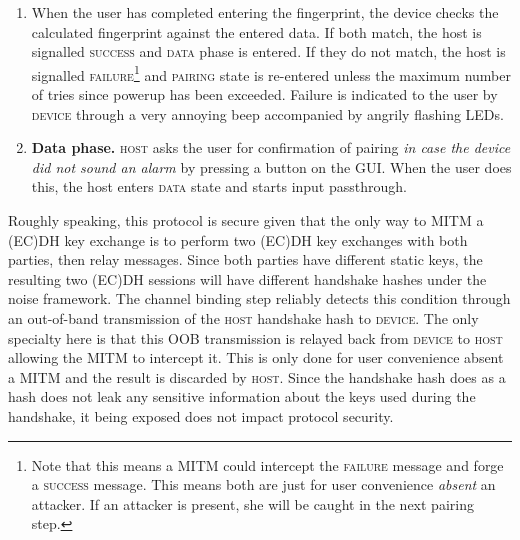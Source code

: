 \documentclass[12pt,a4paper,notitlepage]{article}
\begin{document}
\begin{enumerate}
    field in the pairing GUI. This display is only for user convenience and not relevant to the cryptographic handshake.
    A consequence of this is that a MITM could observe the \emph{fingerprint}\footnote{
        A MITM could also modify the fingerprint information sent from \textsc{device} to \textsc{host}. This would be
        very obvious to the user, since the fingerprint appearing on the \textsc{host} screen would differ from what she
        types.
    }. We show in section \ref{prot_ver} that this does not reduce the protocol's security.
\item When the user has completed entering the fingerprint, the device checks the calculated fingerprint against the
    entered data. If both match, the host is signalled \textsc{success} and \textsc{data} phase is entered. If they do
    not match, the host is signalled \textsc{failure}\footnote{
        Note that this means a MITM could intercept the \textsc{failure} message and forge a \textsc{success} message.
        This means both are just for user convenience \emph{absent} an attacker. If an attacker is present, she will be
        caught in the next pairing step.
    } and \textsc{pairing} state is re-entered unless the maximum number of tries since powerup has been exceeded.
    Failure is indicated to the user by \textsc{device} through a very annoying beep accompanied by angrily flashing
    LEDs.
\item \textbf{Data phase.} \textsc{host} asks the user for confirmation of pairing \emph{in case the device did not
	sound an alarm} by pressing a button on the GUI. When the user does this, the host enters \textsc{data} state and
	starts input passthrough.
\end{enumerate}

Roughly speaking, this protocol is secure given that the only way to MITM a (EC)DH key exchange is to perform two (EC)DH
key exchanges with both parties, then relay messages. Since both parties have different static keys, the resulting two
(EC)DH sessions will have different handshake hashes under the noise framework. The channel binding step reliably
detects this condition through an out-of-band transmission of the \textsc{host} handshake hash to \textsc{device}.
The only specialty here is that this OOB transmission is relayed back from \textsc{device} to \textsc{host} allowing the
MITM to intercept it. This is only done for user convenience absent a MITM and the result is discarded by \textsc{host}.
Since the handshake hash does as a hash does not leak any sensitive information about the keys used during the
handshake, it being exposed does not impact protocol security.
\end{document}
